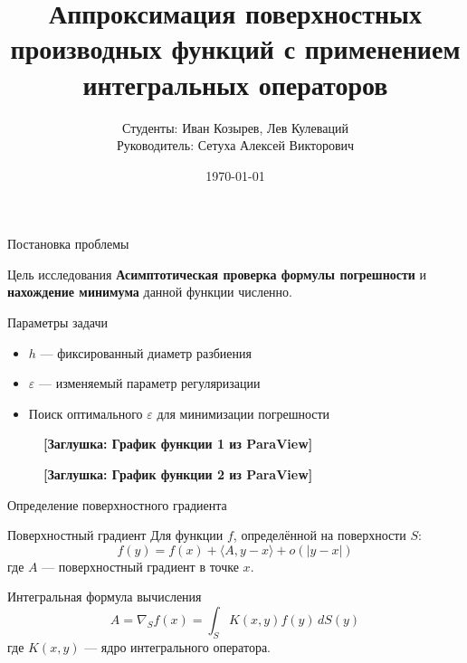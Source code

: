 \documentclass[aspectratio=169,xcolor=dvipsnames]{beamer}
\title{Аппроксимация поверхностных производных функций с применением интегральных операторов}
\author{Студенты: Иван Козырев, Лев Кулеваций \\
 Руководитель: Сетуха Алексей Викторович}
\institute
{
    Образовательный центр «Сириус» \\
    Проект по вычислительной математике
}
\date{\today} %
\begin{document}
\begin{frame}
    \titlepage
\end{frame}

\begin{frame}{Постановка проблемы}
    \begin{alertblock}{Цель исследования}
        \textbf{Асимптотическая проверка формулы погрешности} и \textbf{нахождение минимума} данной функции численно.
    \end{alertblock}
    
    \begin{block}{Параметры задачи}
        \begin{itemize}
            \item $h$ — фиксированный диаметр разбиения
            \item $\varepsilon$ — изменяемый параметр регуляризации
            \item Поиск оптимального $\varepsilon$ для минимизации погрешности
        \end{itemize}
    \end{block}
    
    \begin{figure}
        \centering
        \begin{minipage}{0.45\textwidth}
            \centering
            \textbf{[Заглушка: График функции 1 из ParaView]}
            \vspace{2cm}
        \end{minipage}
        \hfill
        \begin{minipage}{0.45\textwidth}
            \centering
            \textbf{[Заглушка: График функции 2 из ParaView]}
            \vspace{2cm}
        \end{minipage}
    \end{figure}
\end{frame}

\begin{frame}{Определение поверхностного градиента}
    \begin{block}{Поверхностный градиент}
        Для функции $f$, определённой на поверхности $S$:
        \[f(y) = f(x) + \langle A, y - x \rangle + o(|y - x|)\]
        где $A$ — поверхностный градиент в точке $x$.
    \end{block}
    
    \begin{block}{Интегральная формула вычисления}
        \[A = \nabla_S f(x) = \int_S K(x, y) f(y) \, dS(y)\]
        где $K(x, y)$ — ядро интегрального оператора.
    \end{block}
\end{frame}
\end{document}
